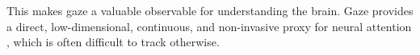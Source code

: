 This makes gaze a valuable observable for understanding the brain. Gaze provides a direct, low-dimensional, continuous, and non-invasive proxy for neural attention \cite{kawashima_attentional_2022, spyropoulos_theta_2018, Bruce_2009_Saliency, chen_spatiotemporal_2022, boccignone_probabilistic_2016, hoffman_probabilistic_2006, wang_attention_2022, misic_active_nodate, ni_distributed_2024}, which is often difficult to track otherwise.
